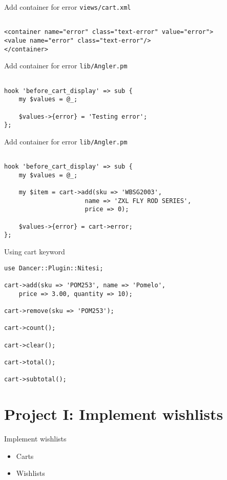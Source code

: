 \begin{frame}[fragile]{Add container for error}
\verb|views/cart.xml|

\begin{lstlisting}

<container name="error" class="text-error" value="error">
<value name="error" class="text-error"/>
</container>
\end{lstlisting}
\end{frame}

\begin{frame}[fragile]{Add container for error}
\verb|lib/Angler.pm|

\begin{lstlisting}

hook 'before_cart_display' => sub {
    my $values = @_;

    $values->{error} = 'Testing error';
};
\end{lstlisting}
\end{frame}

\begin{frame}[fragile]{Add container for error}
\verb|lib/Angler.pm|

\begin{lstlisting}

hook 'before_cart_display' => sub {
    my $values = @_;

    my $item = cart->add(sku => 'WBSG2003',
                      name => 'ZXL FLY ROD SERIES',
                      price => 0);

    $values->{error} = cart->error;
};
\end{lstlisting}
\end{frame}

\begin{frame}[fragile]{Using cart keyword}
\begin{lstlisting}
use Dancer::Plugin::Nitesi;

cart->add(sku => 'POM253', name => 'Pomelo',
    price => 3.00, quantity => 10);

cart->remove(sku => 'POM253');

cart->count();

cart->clear();

cart->total();

cart->subtotal();
\end{lstlisting}
\end{frame}

\section{Project I: Implement wishlists}
\begin{frame}{Implement wishlists}
\begin{itemize}
\item Carts
\item Wishlists
\end{itemize}
\end{frame}



